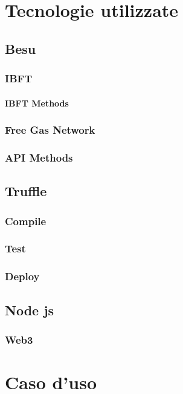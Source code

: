 \documentclass[a4paper]{report}
\begin{document}
\chapter{Tecnologie utilizzate}
\section{Besu}
\subsection{IBFT}
\subsubsection{IBFT Methods}
\subsection{Free Gas Network}
\subsection{API Methods}
\section{Truffle}
\subsection{Compile}
\subsection{Test}
\subsection{Deploy}
\section{Node js}
\subsection{Web3}

\chapter{Caso d'uso}
\end{document}
